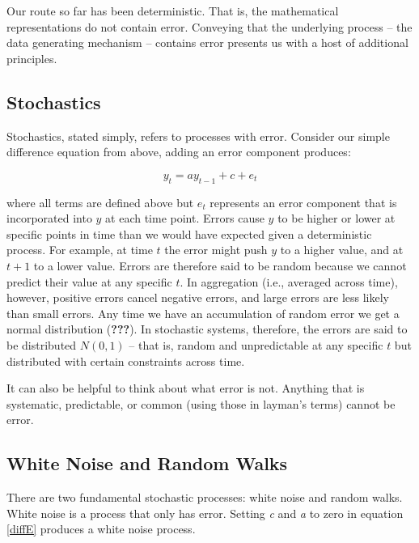\documentclass[english,,man]{apa6}
\theoremstyle{definition}
\theoremstyle{definition}
\theoremstyle{definition}
\theoremstyle{remark}
\begin{document}
Our route so far has been deterministic. That is, the mathematical
representations do not contain error. Conveying that the underlying
process -- the data generating mechanism -- contains error presents us
with a host of additional principles.

\hypertarget{stochastics}{%
\subsection{Stochastics}\label{stochastics}}

Stochastics, stated simply, refers to processes with error. Consider our
simple difference equation from above, adding an error component
produces:

\begin{equation}
\label{diffE}
y_{t} = a y_{t-1} + c + e_{t}
\end{equation}

\noindent where all terms are defined above but \(e_{t}\) represents an
error component that is incorporated into \(y\) at each time point.
Errors cause \(y\) to be higher or lower at specific points in time than
we would have expected given a deterministic process. For example, at
time \(t\) the error might push \(y\) to a higher value, and at \(t+1\)
to a lower value. Errors are therefore said to be random because we
cannot predict their value at any specific \(t\). In aggregation (i.e.,
averaged across time), however, positive errors cancel negative errors,
and large errors are less likely than small errors. Any time we have an
accumulation of random error we get a normal distribution
({\textbf{???}}). In stochastic systems, therefore, the errors are said
to be distributed \(N(0, 1)\) -- that is, random and unpredictable at
any specific \(t\) but distributed with certain constraints across time.

It can also be helpful to think about what error is not. Anything that
is systematic, predictable, or common (using those in layman's terms)
cannot be error.

\hypertarget{white-noise-and-random-walks}{%
\subsection{White Noise and Random
Walks}\label{white-noise-and-random-walks}}

There are two fundamental stochastic processes: white noise and random
walks. White noise is a process that only has error. Setting \emph{c}
and \emph{a} to zero in equation \ref{diffE} produces a white noise
process.
\end{document}
